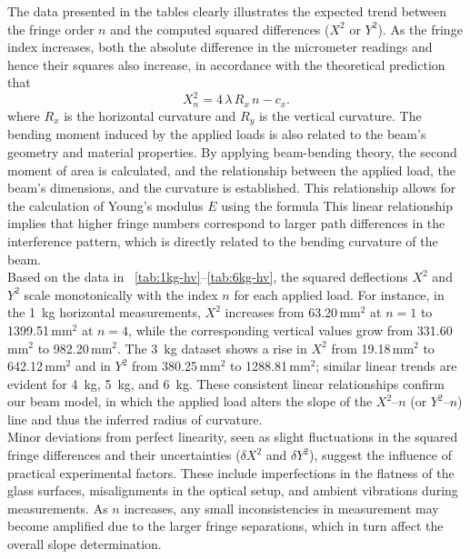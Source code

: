 \documentclass[a4paper,11pt]{article}
\begin{document}
The data presented in the tables clearly illustrates the expected trend between the fringe order \(n\) and the computed squared differences (\(X^2\) or \(Y^2\)). As the fringe index increases, both the absolute difference in the micrometer readings and hence their squares also increase, in accordance with the theoretical prediction that
\begin{equation}
X_n^2 = 4\,\lambda\,R_x\,n - c_x.
\end{equation}
where \(R_x\) is the horizontal curvature and \(R_y\) is the vertical curvature. The bending moment induced by the applied loads is also related to the beam's geometry and material properties. By applying beam-bending theory, the second moment of area is calculated, and the relationship between the applied load, the beam's dimensions, and the curvature is established. This relationship allows for the calculation of Young's modulus \(E\) using the formula
This linear relationship implies that higher fringe numbers correspond to larger path differences in the interference pattern, which is directly related to the bending curvature of the beam.\\

Based on the data in ~\autoref{tab:1kg-hv}--\autoref{tab:6kg-hv}, the squared deflections \(X^2\) and \(Y^2\) scale monotonically with the index \(n\) for each applied load. For instance, in the 1 kg horizontal measurements, \(X^2\) increases from 63.20\,mm\(^2\) at \(n=1\) to 1399.51\,mm\(^2\) at \(n=4\), while the corresponding vertical values grow from 331.60\,mm\(^2\) to 982.20\,mm\(^2\). The 3 kg dataset shows a rise in \(X^2\) from 19.18\,mm\(^2\) to 642.12\,mm\(^2\) and in \(Y^2\) from 380.25\,mm\(^2\) to 1288.81\,mm\(^2\); similar linear trends are evident for 4 kg, 5 kg, and 6 kg. These consistent linear relationships confirm our beam model, in which the applied load alters the slope of the \(X^2\)–\(n\) (or \(Y^2\)–\(n\)) line and thus the inferred radius of curvature.\\


Minor deviations from perfect linearity, seen as slight fluctuations in the squared fringe differences and their uncertainties (\(\delta X^2\) and \(\delta Y^2\)), suggest the influence of practical experimental factors. These include imperfections in the flatness of the glass surfaces, misalignments in the optical setup, and ambient vibrations during measurements. As \(n\) increases, any small inconsistencies in measurement may become amplified due to the larger fringe separations, which in turn affect the overall slope determination.\\
\end{document}
